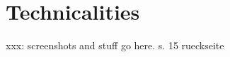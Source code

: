 
\chapter{Technicalities}
\label{chap:app:technicalities}

xxx: screenshots and stuff go here.
s. 15 rueckseite

